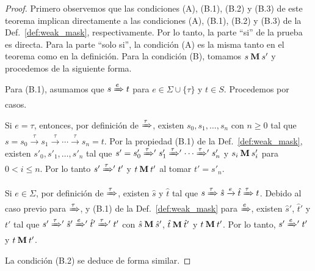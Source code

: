 \noindent
\begin{proof}
Primero observemos que las condiciones (A), (B.1), (B.2) y (B.3) de este teorema implican directamente a las condiciones (A), (B.1), (B.2) y (B.3) de la Def.~\ref{def:weak_mask}, respectivamente. Por lo tanto, la parte ``si'' de la prueba es directa. Para la parte ``solo si'', la condición (A) es la misma tanto en el teorema como en la definición.
Para la condición (B), tomamos $s \mathbin{\mathbf{M}} s'$ y procedemos de la siguiente forma.

Para (B.1), asumamos que $s \xRightarrow{e} t$ para $e \in \Sigma \cup \{\tau\}$ y $t \in S$.
Procedemos por casos.

Si $e = \tau$, entonces, por definición de $\xRightarrow{\tau}$, existen $s_0,s_1,\ldots,s_n$ con $n\geq0$ tal que $s=s_0\xrightarrow{\tau}s_1\xrightarrow{\tau}{\cdots}\xrightarrow{\tau}s_n=t$.
%
Por la propiedad (B.1) de la Def.~\ref{def:weak_mask}, existen $s'_0,s'_1,\ldots,s'_n$ tal que $s'=s'_0\mathrel{{\xRightarrow[]{\tau}}{}'}s'_1\mathrel{{\xRightarrow[]{\tau}}{}'}{\cdots}\mathrel{{\xRightarrow[]{\tau}}{}'}s'_n$ y $s_i \mathbin{\mathbf{M}} s'_i$ para $0<i\leq n$. Por lo tanto $s' \mathrel{{\xRightarrow[]{\tau}}{}'} t'$ y $t \mathbin{\mathbf{M}} t'$ al tomar $t'=s'_n$.

Si $e \in \Sigma$, por definición de $\xRightarrow{\tau}$, existen $\hat{s}$ y $\hat{t}$ tal que $s\xRightarrow{\tau}\hat{s}\xrightarrow{e}\hat{t}\xRightarrow{\tau}t$.
Debido al caso previo para $\xRightarrow{\tau}$, y (B.1) de la Def.~\ref{def:weak_mask} para $\xRightarrow{e}$, existen $\hat{s}'$, $\hat{t}'$ y $t'$ tal que $s'\mathrel{{\xRightarrow[]{\tau}}{}'}\hat{s}'\mathrel{{\xRightarrow[]{e}}{}'}\hat{t}'\mathrel{{\xRightarrow[]{\tau}}{}'}t'$ con $\hat{s} \mathbin{\mathbf{M}} \hat{s}'$, $\hat{t} \mathbin{\mathbf{M}} \hat{t}'$ y $t \mathbin{\mathbf{M}} t'$.
Por lo tanto, $s'\mathrel{{\xRightarrow[]{e}}{}'}t'$ y $t \mathbin{\mathbf{M}} t'$.

La condición (B.2) se deduce de forma similar.


\end{proof}
